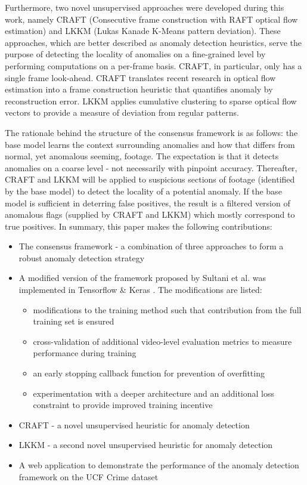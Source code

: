 \documentclass[sigplan,authorversion,nonacm, 9pt]{acmart}
\begin{document}
\par
Furthermore, two novel unsupervised approaches were developed during this work, namely CRAFT (Consecutive frame construction with RAFT optical flow estimation) and LKKM (Lukas Kanade K-Means pattern deviation). These approaches, which are better described as anomaly detection heuristics, serve the purpose of detecting the locality of anomalies on a fine-grained level by performing computations on a per-frame basis. CRAFT, in particular, only has a single frame look-ahead.
CRAFT translates recent research in optical flow estimation into a frame construction heuristic that quantifies anomaly by reconstruction error. LKKM applies cumulative clustering to sparse optical flow vectors to provide a measure of deviation from regular patterns. 
\par 
The rationale behind the structure of the consensus framework is as follows:
the base model learns the context surrounding anomalies and how that differs from normal, yet anomalous seeming, footage. The expectation is that it detects anomalies on a coarse level - not necessarily with pinpoint accuracy. Thereafter, CRAFT and LKKM will be applied to suspicious sections of footage (identified by the base model) to detect the locality of a potential anomaly. If the base model is sufficient in deterring false positives, the result is a filtered version of anomalous flags (supplied by CRAFT and LKKM) which mostly correspond to true positives. In summary, this paper makes the following contributions:
\begin{itemize}
    \item The consensus framework - a combination of three approaches to form a robust anomaly detection strategy
    \item A modified version of the framework proposed by Sultani et al. \cite{sultani} was implemented in Tensorflow \cite{tensorflow} \& Keras \cite{keras}. The modifications are listed:
    \begin{itemize}
        \item modifications to the training method such that contribution from the full training set is ensured
        \item cross-validation of additional video-level evaluation metrics to measure performance during training
        \item an early stopping callback function for prevention of overfitting 
        \item experimentation with a deeper architecture and an additional loss constraint to provide improved training incentive
    \end{itemize}
    \item CRAFT - a novel unsupervised heuristic for anomaly detection
    \item LKKM - a second novel unsupervised heuristic for anomaly detection
    \item A web application to demonstrate the performance of the anomaly detection framework on the UCF Crime dataset \cite{dataset}
\end{itemize}
\end{document}
